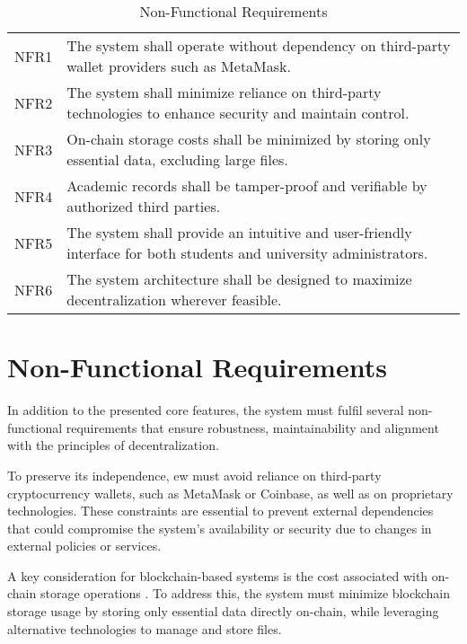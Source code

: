 \begin{table}[htpb]
\centering
\caption{Non-Functional Requirements}
\label{tab:nonFuncReq}
\begin{tabular}{|p{1.0cm}|p{11cm}|}
\hline
NFR1 & The system shall operate without dependency on third-party wallet providers such as MetaMask. \\
NFR2 & The system shall minimize reliance on third-party technologies to enhance security and maintain control. \\
NFR3 & On-chain storage costs shall be minimized by storing only essential data, excluding large files. \\
NFR4 & Academic records shall be tamper-proof and verifiable by authorized third parties. \\
NFR5 & The system shall provide an intuitive and user-friendly interface for both students and university administrators. \\
NFR6 & The system architecture shall be designed to maximize decentralization wherever feasible. \\
\hline
\end{tabular}
\end{table}
\section{Non-Functional Requirements}
\label{sec:nonFunctionalRequirements}
In addition to the presented core features, the system must fulfil several non-functional requirements that ensure robustness, maintainability and alignment with the principles of decentralization. 

To preserve its independence, \acrshort{ew} must avoid reliance on third-party cryptocurrency wallets, such as MetaMask or Coinbase, as well as on proprietary technologies. These constraints are essential to prevent external dependencies that could compromise the system’s availability or security due to changes in external policies or services.

A key consideration for blockchain-based systems is the cost associated with on-chain storage operations \cite{surya2024designdecentralizedidentity}. To address this, the system must minimize blockchain storage usage by storing only essential data directly on-chain, while leveraging alternative technologies to manage and store files.

